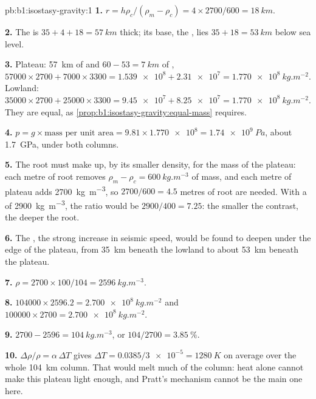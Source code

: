 \begin{solution}{pb:b1:isostasy-gravity:1}
\textbf{1.} $r = h\rho_c/(\rho_m - \rho_c) = 4\times2700/600 = \qty{18}{km}$.

\textbf{2.} The  is $35 + 4 + 18 = \qty{57}{km}$ thick; its base, the ,
lies $35 + 18 = \qty{53}{km}$ below sea level.

\textbf{3.} Plateau: \qty{57}{km} of  and $60 - 53 = \qty{7}{km}$ of ,
$\num{57000}\times2700 + \num{7000}\times3300 = \num{1.539e8} + \num{2.31e7} =
\qty{1.770e8}{kg.m^{-2}}$. Lowland: $\num{35000}\times2700 + \num{25000}\times3300
= \num{9.45e7} + \num{8.25e7} = \qty{1.770e8}{kg.m^{-2}}$. They are equal, as
\cref{prop:b1:isostasy-gravity:equal-mass} requires.

\textbf{4.} $p = g\times\text{mass per unit area} = 9.81\times\num{1.770e8} =
\qty{1.74e9}{Pa}$, about \qty{1.7}{GPa}, under both columns.

\textbf{5.} The root must make up, by its smaller density, for the mass of the
plateau: each metre of root removes $\rho_m - \rho_c = \qty{600}{kg.m^{-3}}$ of
mass, and each metre of plateau adds \qty{2700}{kg.m^{-3}}, so $2700/600 = 4.5$
metres of root are needed. With a  of \qty{2900}{kg.m^{-3}}, the ratio
would be $2900/400 = 7.25$: the smaller the contrast, the deeper the root.

\textbf{6.} The , the strong increase in seismic speed, would be found
to deepen under the edge of the plateau, from \qty{35}{km} beneath the lowland
to about \qty{53}{km} beneath the plateau.

\textbf{7.} $\rho = 2700\times100/104 = \qty{2596}{kg.m^{-3}}$.

\textbf{8.} $\num{104000}\times2596.2 = \qty{2.700e8}{kg.m^{-2}}$ and
$\num{100000}\times2700 = \qty{2.700e8}{kg.m^{-2}}$.

\textbf{9.} $2700 - 2596 = \qty{104}{kg.m^{-3}}$, or $104/2700 =
\qty{3.85}{\percent}$.

\textbf{10.} $\Delta\rho/\rho = \alpha\,\Delta T$ gives $\Delta T =
0.0385/\num{3e-5} = \qty{1280}{K}$ on average over the whole \qty{104}{km}
column. That would melt much of the column: heat alone cannot make this plateau
light enough, and Pratt's mechanism cannot be the main one here.


\end{solution}
